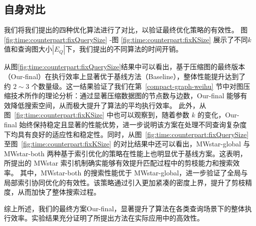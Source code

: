 \subsection{自身对比}
\label{ch5:couterparts}
我们将我们提出的四种优化算法进行了对比，以验证最终优化策略的有效性。
图 \ref{fig:time:counterpart:fixQuerySize} -图 \ref{fig:time:counterpart:fixKSize} 展示了不同$k$值和查询图大小$|E_Q|$下，我们提出的不同算法的时间开销。


从图\ref{fig:time:counterpart:fixQuerySize}结果中可以看出，基于压缩图的最终版本（Our-final）在执行效率上显著优于基线方法（Baseline），整体性能提升达到了约 $2{\sim}3$ 个数量级。这一结果验证了我们在第~\ref{compact-graph-weihu} 节中对图压缩技术所作的理论分析：通过显著压缩数据图的节点数与边数，Our-final 能够有效降低搜索空间，从而极大提升了算法的平均执行效率。
此外，从图~\ref{fig:time:counterpart:fixKSize} 中也可以观察到，随着参数 $k$ 的变化，Our-final 始终保持稳定且显著的性能优势，进一步说明该方案在处理不同查询复杂度下均具有良好的适应性和稳定性。同时，从图~\ref{fig:time:counterpart:fixQuerySize} 至图~\ref{fig:time:counterpart:fixKSize} 的对比结果中还可以看出，MWstar-global 与 MWstar-both 两种基于索引优化的策略在性能上也明显优于基线方案。这表明，所提出的 MWstar 索引机制确实能够有效提升匹配过程中的剪枝能力和搜索效率。
其中，MWstar-both 的搜索性能优于 MWstar-global，进一步验证了全局与局部索引协同优化的有效性。该策略通过引入更加紧凑的密度上界，提升了剪枝精度，从而加快了整体搜索过程。

综上所述，我们的最终方案Our-final，显著提升了算法在各类查询场景下的整体执行效率。实验结果充分证明了所提出方法在实际应用中的高效性。

